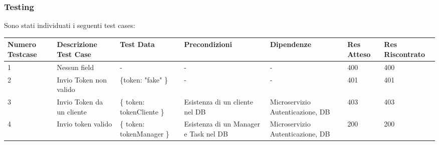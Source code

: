 \documentclass{report}
\begin{document}
\subsubsection*{Testing}

Sono stati individuati i seguenti test cases:
\begin{center} %
	\centering
	\begin{tabular}{ |p{1cm}|p{2cm}|p{2cm}|p{2cm}|p{2cm}|p{1cm}|p{1cm}| }
		\hline
		Numero Testcase & Descrizione Test Case     & Test Data                 & Precondizioni                         & Dipendenze                       & Res Atteso & Res Riscontrato \\
		\hline
		1               & Nessun field              & -                         & -                                     & -                                & 400        & 400             \\
		\hline
		2               & Invio Token non valido    & \{token: "fake" \}        & -                                     & -                                & 401        & 401             \\
		\hline
		3               & Invio Token da un cliente & \{ token: tokenCliente \} & Esistenza di un cliente nel DB        & Microservizio Autenticazione, DB & 403        & 403             \\
		\hline
		4               & Invio token valido        & \{ token: tokenManager \} & Esistenza di un Manager e Task nel DB & Microservizio Autenticazione, DB & 200        & 200             \\
		\hline
	\end{tabular}
\end{center}
\end{document}
